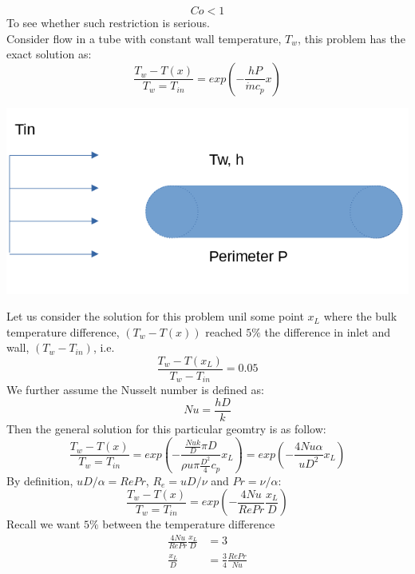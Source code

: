 \documentclass[11pt]{article}
\begin{document}
\begin{equation}
\boxed{Co < 1}
\end{equation}
To see whether such restriction is serious. \\
Consider flow in a tube with constant wall temperature, \(T_w\), this problem has the exact solution as:
\begin{equation*}
\frac{T_w - T(x)}{T_w=T_{in}} = exp\left(-\frac{hP}{\dot{m}c_p}x \right)
\end{equation*}
\begin{center}
\includegraphics[scale=0.5]{pic/tube_twall.png}
\end{center}
Let us consider the solution for this problem unil some point \(x_L\) where the bulk temperature difference, \((T_w - T(x))\)
reached \(5\%\) the difference in inlet and wall, \((T_w-T_{in})\), i.e.
\begin{equation*}
\frac{T_w-T(x_L)}{T_w-T_{in}} = 0.05
\end{equation*}
We further assume the Nusselt number is defined as:
\begin{equation*}
Nu = \frac{hD}{k}
\end{equation*}
Then the general solution for this particular geomtry is as follow:
\begin{equation*}
\frac{T_w - T(x)}{T_w=T_{in}} = exp\left(  -\frac{   \frac{Nuk}{D} \pi D } {\rho u \pi \frac{D^2}{4}  c_p} x_L \right) = exp\left(- \frac{4Nu\alpha}{uD^2}x_L   \right)
\end{equation*}
By definition, \(uD/\alpha = RePr\), \(R_e = uD/\nu\) and \(Pr = \nu/\alpha\):
\begin{equation*}
\frac{T_w - T(x)}{T_w=T_{in}} = exp\left(- \frac{4Nu}{RePr}\frac{x_L}{D}   \right)
\end{equation*}
Recall we want \(5\%\) between the temperature difference
\begin{equation*}
\begin{aligned}
\frac{4Nu}{RePr}\frac{x_L}{D} &= 3\\
\frac{x_L}{D} &= \frac{3}{4}\frac{RePr}{Nu}
\end{aligned}
\end{equation*}
\end{document}
